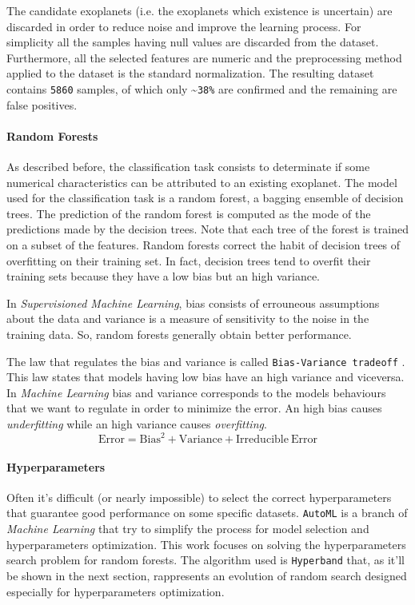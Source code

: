 \documentclass[11pt, a4paper]{article}
\begin{document}
    The candidate exoplanets (i.e. the exoplanets which existence is uncertain) are discarded in order to reduce noise and improve the learning process.
    For simplicity all the samples having null values are discarded from the dataset.
    Furthermore, all the selected features are numeric and the preprocessing method applied to the dataset is the standard normalization.
    The resulting dataset contains \texttt{5860} samples, of which only \textasciitilde \texttt{38\%} are confirmed and the remaining are false positives.

  \paragraph{Random Forests}
    As described before, the classification task consists to determinate if some numerical characteristics can be attributed to an existing exoplanet.
    The model used for the classification task is a random forest, a bagging ensemble of decision trees.
    The prediction of the random forest is computed as the mode of the predictions made by the decision trees.
    Note that each tree of the forest is trained on a subset of the features.
    Random forests correct the habit of decision trees of overfitting on their training set.
    In fact, decision trees tend to overfit their training sets because they have a low bias but an high variance.

    In \textit{Supervisioned Machine Learning}, bias consists of errouneous assumptions about the data and variance is a measure of sensitivity to the noise in the training data.
    So, random forests generally obtain better performance.

    The law that regulates the bias and variance is called \texttt{Bias-Variance tradeoff} \cite{biasvariance}.
    This law states that models having low bias have an high variance and viceversa.
    In \textit{Machine Learning} bias and variance corresponds to the models behaviours that we want to regulate in order to minimize the error.
    An high bias causes \textit{underfitting} while an high variance causes \textit{overfitting}.
      \[\mathrm{Error}=\mathrm{Bias}^{2}+\mathrm{Variance}+\mathrm{Irreducible\:Error}\]

  \paragraph{Hyperparameters}
    Often it's difficult (or nearly impossible) to select the correct hyperparameters that guarantee good performance on some specific datasets.
    \texttt{AutoML} is a branch of \textit{Machine Learning} that try to simplify the process for model selection and hyperparameters optimization.
    This work focuses on solving the hyperparameters search problem for random forests.
    The algorithm used is \texttt{Hyperband} that, as it'll be shown in the next section, rappresents an evolution of random search designed especially for hyperparameters optimization.
\end{document}
